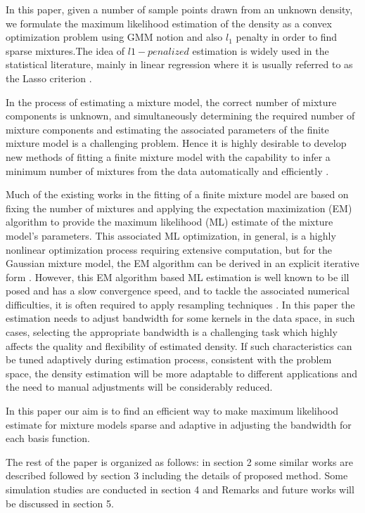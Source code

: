 In this paper, given a number of sample points drawn from an unknown density, we formulate the maximum likelihood estimation of the density as a convex optimization problem using GMM notion and also $l_1$ penalty in order to find sparse mixtures.The idea of $l1-penalized$ estimation is widely used in the statistical literature, mainly in linear regression where it is usually referred to as the Lasso criterion \cite{bunea2007sparse}.  

In the process of estimating a mixture model, the correct number of mixture components is unknown, and simultaneously determining the required number of mixture components and estimating the associated parameters of the finite mixture model is a challenging problem. Hence it is highly desirable to develop new methods of fitting a finite mixture model with the capability to infer a minimum number of mixtures from the data automatically and efficiently \cite{hong2013sparse}. 

Much of the existing works in the fitting of a finite mixture model are based on fixing the number of mixtures and applying the expectation maximization (EM) algorithm \cite{bunea2009dimension} to provide the maximum likelihood (ML) estimate of the mixture model’s parameters. This associated ML optimization, in general, is a highly nonlinear optimization process requiring extensive computation, but for the Gaussian mixture model, the EM algorithm can be derived in an explicit iterative form \cite{hong2013sparse}. However, this EM algorithm based ML estimation is well known to be ill posed and has a slow convergence speed, and to tackle the associated numerical difficulties, it is often required to apply resampling techniques \cite{hong2013sparse}.
In this paper the estimation needs to adjust bandwidth for some kernels in the data space, in such cases, selecting the appropriate bandwidth is a challenging task which highly affects the quality and flexibility of estimated density. If such characteristics can be tuned adaptively during estimation process, consistent with the problem space, the density estimation will be more adaptable to different applications and the need to manual adjustments will be considerably reduced. \par
In this paper our aim is to find an efficient way to make maximum likelihood estimate for mixture models sparse and adaptive in adjusting the bandwidth for each basis function.

The rest of the paper is organized as follows: in section 2 some similar works are described followed by section 3 including the details of proposed method. Some simulation studies are conducted in section 4 and Remarks and future works will be discussed in section 5.